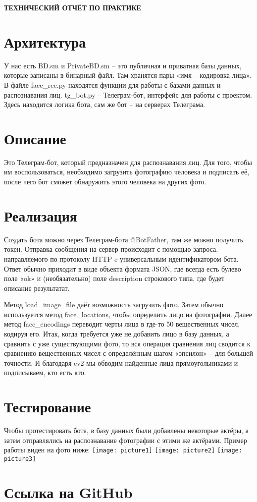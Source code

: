 \begin{center}
\bfseries{\large ТЕХНИЧЕСКИЙ ОТЧЁТ ПО ПРАКТИКЕ}
\end{center}

\section*{Архитектура}
У нас есть BD.sm и PrivateBD.sm – это публичная и приватная базы данных, которые записаны в бинарный файл. Там хранятся пары «имя – кодировка лица». 
В файле face\_rec.py находятся функции для работы с базами данных и распознавания лиц.
tg\_bot.py – Телеграм-бот, интерфейс для работы с проектом. Здесь находится логика бота, сам же бот – на серверах Телеграма.
\section*{Описание}
Это Телеграм-бот, который предназначен для распознавания лиц. Для того, чтобы им воспользоваться, необходимо загрузить фотографию человека и подписать её, после чего бот сможет обнаружить этого человека на других фото.
\section*{Реализация}
Создать бота можно через Телеграм-бота @BotFather, там же можно получить токен.
Отправка сообщения на сервер происходит с помощью запроса, направляемого по протоколу HTTP c универсальным идентификатором бота. Ответ обычно приходит в виде объекта формата JSON, где всегда есть булево поле «ok» и (необязательно) поле description строкового типа, где будет описание результатат.

Метод load\_image\_ﬁle даёт возможность загрузить фото. Затем обычно используется метод  face\_locations, чтобы определить лицо на фотографии. Далее метод face\_encodings переводит черты лица в где-то 50 вещественных чисел, кодируя его.
Итак, когда требуется уже не добавить лицо в базу данных, а сравнить с уже существующими фото, то вся операция сравнения лиц сводится к сравнению вещественных чисел с определённым шагом «эпсилон» – для большей точности.
И благодаря cv2 мы обводим найденные лица прямоугольниками и подписываем, кто есть кто.
\section*{Тестирование}
Чтобы протестировать бота, в базу данных были добавлены некоторые актёры, а затем отправлялись на распознавание фотографии с этими же актёрами.
Пример работы виден на фото ниже:
\texttt{[image: picture1]} \linebreak
\texttt{[image: picture2]} \linebreak
\texttt{[image: picture3]} \linebreak
\section*{Ссылка на GitHub}

\pagebreak
